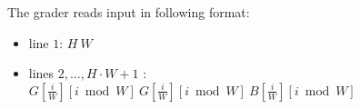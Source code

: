 The grader reads input in following format:
\begin{itemize}
\item line $1$: $H\ W$
\item lines $2, \dots, H \cdot W + 1$ : $G[\frac{i}{W}][i \bmod W]\ G[\frac{i}{W}][i \bmod W]\ B[\frac{i}{W}][i \bmod W]$
\end{itemize}

